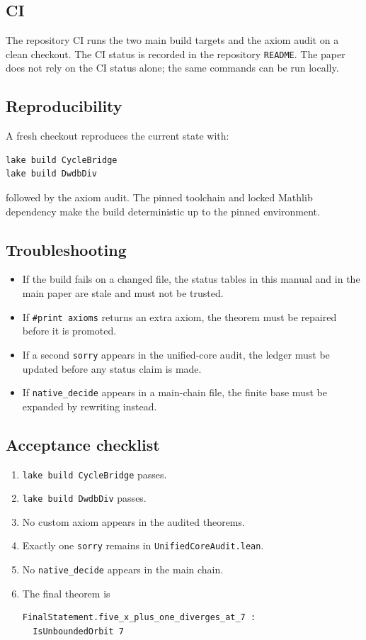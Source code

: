 \subsection{CI}

The repository CI runs the two main build targets and the axiom
audit on a clean checkout.  The CI status is recorded in the
repository \texttt{README}.  The paper does not rely on the CI status
alone; the same commands can be run locally.

\subsection{Reproducibility}

A fresh checkout reproduces the current state with:
\begin{verbatim}
lake build CycleBridge
lake build DwdbDiv
\end{verbatim}
followed by the axiom audit.  The pinned toolchain and locked
Mathlib dependency make the build deterministic up to the pinned
environment.

\subsection{Troubleshooting}

\begin{itemize}[leftmargin=*]
\item If the build fails on a changed file, the status tables in this
  manual and in the main paper are stale and must not be trusted.
\item If \texttt{\#print axioms} returns an extra axiom, the theorem
  must be repaired before it is promoted.
\item If a second \texttt{sorry} appears in the unified-core audit,
  the ledger must be updated before any status claim is made.
\item If \texttt{native\_decide} appears in a main-chain file, the
  finite base must be expanded by rewriting instead.
\end{itemize}

\subsection{Acceptance checklist}

\begin{enumerate}[leftmargin=*]
\item \texttt{lake build CycleBridge} passes.
\item \texttt{lake build DwdbDiv} passes.
\item No custom axiom appears in the audited theorems.
\item Exactly one \texttt{sorry} remains in
  \texttt{UnifiedCoreAudit.lean}.
\item No \texttt{native\_decide} appears in the main chain.
\item The final theorem is
  \begin{verbatim}
FinalStatement.five_x_plus_one_diverges_at_7 :
  IsUnboundedOrbit 7
  \end{verbatim}
\end{enumerate}

